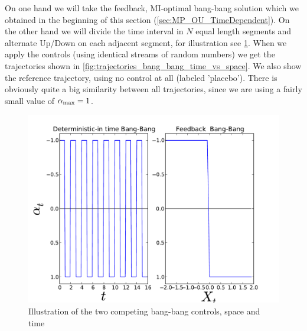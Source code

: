 On one hand we will take the feedback, MI-optimal bang-bang solution which we
obtained in the beginning of this section (\cref{sec:MP_OU_TimeDependent}). On
the other hand we will divide the time interval in $N$ equal length segments and
alternate Up/Down on each adjacent segment, for illustration see  
\cref{fig:bang_bang_time_vs_space}. When we apply the controls (using identical
streams of random numbers) we get the trajectories shown in
\cref{fig:trajectories_bang_bang_time_vs_space}. We also show the reference
trajectory, using no control at all (labeled 'placebo'). There is obviously
quite a big similarity between all trajectories, since we are using a fairly 
small value of ${ \alpha_{\textrm{max}} }= 1$.

\begin{figure}[htp]
\begin{center}
  \includegraphics[width=1\textwidth]{Figs/OU_MIControlSimulator/Fb_vs_det_control_illustrate.pdf}
  \caption[labelInTOC]{Illustration of the two competing bang-bang controls,
  space and time}
  \label{fig:bang_bang_time_vs_space}
\end{center}
\end{figure}
